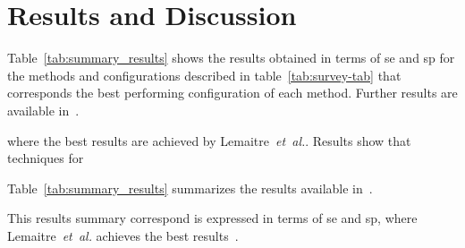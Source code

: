 \section{Results and Discussion}\label{sec:results}\label{sec:discussion}

Table~\ref{tab:summary_results} shows the results obtained in terms of \gls{se} and \gls{sp} for the methods and configurations described in table~\ref{tab:survey-tab} that corresponds the best performing configuration of each method.
Further results are available in~\cite{rethinopaty20016apr-repoICPR}.



where the best results are achieved by Lemaitre~\emph{et~al.}.
Results show that  techniques for 
% 



Table~\ref{tab:summary_results} summarizes the results available in~\cite{rethinopaty20016apr-repoICPR}.

This results summary correspond  is expressed in terms of \gls{se} and \gls{sp}, where Lemaitre~\emph{et~al.} achieves the best results~\cite{Lemaintre2015miccaiOCT}.

